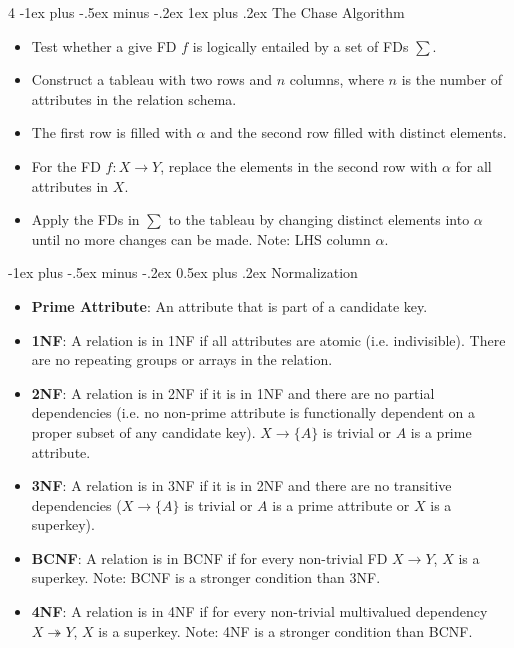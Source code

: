 \documentclass[10pt, landscape]{article}
\makeatletter
\renewcommand{\section}{\@startsection{section}{1}{0mm}%
  {-1ex plus -.5ex minus -.2ex}%
  {0.5ex plus .2ex}%
{\normalfont\large\bfseries}}
\renewcommand{\subsubsection}{\@startsection{subsubsection}{3}{0mm}%
  {-1ex plus -.5ex minus -.2ex}%
  {1ex plus .2ex}%
{\normalfont\small\bfseries}}%
\makeatother
\begin{document}
\begin{multicols*}{4}
  \subsubsection{The Chase Algorithm}
  \begin{itemize}
    \item Test whether a give FD $f$ is logically entailed by a set of FDs $\sum$.
    \item Construct a tableau with two rows and $n$ columns, where $n$ is the number of attributes in the relation schema. 
    \item The first row is filled with $\alpha$ and the second row filled with distinct elements.
    \item For the FD $f: X \rightarrow Y$, replace the elements in the second row with $\alpha$ for all attributes in $X$.
    \item Apply the FDs in $\sum$ to the tableau by changing distinct elements into $\alpha$ until no more changes can be made. Note: LHS column $\alpha$.
  \end{itemize}

  \section{Normalization}
  \begin{itemize}
    \item \textbf{Prime Attribute}: An attribute that is part of a candidate key.
    \item \textbf{1NF}: A relation is in 1NF if all attributes are atomic (i.e. indivisible). There are no repeating groups or arrays in the relation.
    \item \textbf{2NF}: A relation is in 2NF if it is in 1NF and there are no partial dependencies (i.e. no non-prime attribute is functionally dependent on a proper subset of any candidate key). $X \rightarrow \{A\}$ is trivial or $A$ is a prime attribute.
    \item \textbf{3NF}: A relation is in 3NF if it is in 2NF and there are no transitive dependencies ($X \rightarrow \{A\}$ is trivial or $A$ is a prime attribute or $X$ is a superkey).
    \item \textbf{BCNF}: A relation is in BCNF if for every non-trivial FD $X \rightarrow Y$, $X$ is a superkey. Note: BCNF is a stronger condition than 3NF.
    \item \textbf{4NF}: A relation is in 4NF if for every non-trivial multivalued dependency $X \twoheadrightarrow Y$, $X$ is a superkey. Note: 4NF is a stronger condition than BCNF.
    

\end{itemize}
\end{multicols*}
\end{document}

